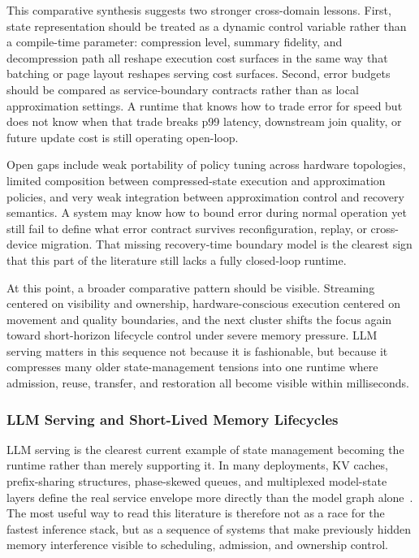\documentclass[acmsmall,screen,review]{acmart}
\begin{document}
This comparative synthesis suggests two stronger cross-domain lessons. First, state representation should be treated as a dynamic control variable rather than a compile-time parameter: compression level, summary fidelity, and decompression path all reshape execution cost surfaces in the same way that batching or page layout reshapes serving cost surfaces. Second, error budgets should be compared as service-boundary contracts rather than as local approximation settings. A runtime that knows how to trade error for speed but does not know when that trade breaks p99 latency, downstream join quality, or future update cost is still operating open-loop.

Open gaps include weak portability of policy tuning across hardware topologies, limited composition between compressed-state execution and approximation policies, and very weak integration between approximation control and recovery semantics. A system may know how to bound error during normal operation yet still fail to define what error contract survives reconfiguration, replay, or cross-device migration. That missing recovery-time boundary model is the clearest sign that this part of the literature still lacks a fully closed-loop runtime.

At this point, a broader comparative pattern should be visible. Streaming centered on visibility and ownership, hardware-conscious execution centered on movement and quality boundaries, and the next cluster shifts the focus again toward short-horizon lifecycle control under severe memory pressure. LLM serving matters in this sequence not because it is fashionable, but because it compresses many older state-management tensions into one runtime where admission, reuse, transfer, and restoration all become visible within milliseconds.

\subsubsection{LLM Serving and Short-Lived Memory Lifecycles}

LLM serving is the clearest current example of state management becoming the runtime rather than merely supporting it. In many deployments, KV caches, prefix-sharing structures, phase-skewed queues, and multiplexed model-state layers define the real service envelope more directly than the model graph alone~\cite{kwon2023pagedattention,agrawal2024sarathi,li2023alpaserve,chen2024punica}. The most useful way to read this literature is therefore not as a race for the fastest inference stack, but as a sequence of systems that make previously hidden memory interference visible to scheduling, admission, and ownership control.
\end{document}

